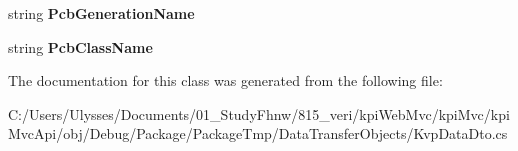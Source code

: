 \begin{DoxyCompactItemize}
\item 
\mbox{\label{classkpi_mvc_api_1_1_data_transfer_objects_1_1_kvp_dto_aadebf4f744274e6e49ff49e3a14cd016}} 
string {\bfseries Pcb\+Generation\+Name}
\item 
\mbox{\label{classkpi_mvc_api_1_1_data_transfer_objects_1_1_kvp_dto_a9ad0f1749a89b8696b1e7f5690540606}} 
string {\bfseries Pcb\+Class\+Name}
\end{DoxyCompactItemize}


The documentation for this class was generated from the following file\+:\begin{DoxyCompactItemize}
\item 
C\+:/\+Users/\+Ulysses/\+Documents/01\+\_\+\+Study\+Fhnw/815\+\_\+veri/kpi\+Web\+Mvc/kpi\+Mvc/kpi\+Mvc\+Api/obj/\+Debug/\+Package/\+Package\+Tmp/\+Data\+Transfer\+Objects/Kvp\+Data\+Dto.\+cs\end{DoxyCompactItemize}

